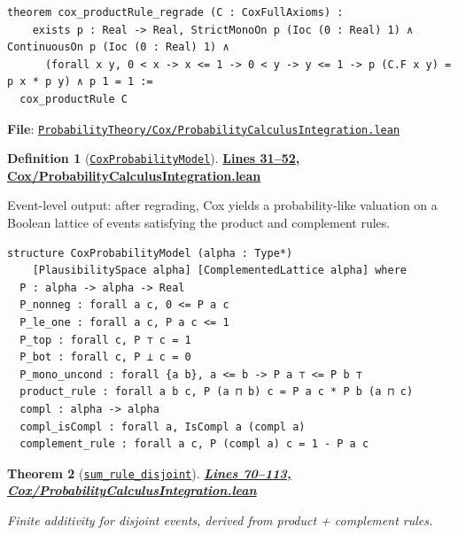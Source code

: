 \documentclass[11pt]{article}
\newtheorem{theorem}{Theorem}[section]
\theoremstyle{definition}
\newtheorem{definition}[theorem]{Definition}
\theoremstyle{remark}
\begin{document}
\begin{lstlisting}[caption={Bridge: Cox product rule as a K\&S-style regrade}]
theorem cox_productRule_regrade (C : CoxFullAxioms) :
    exists p : Real -> Real, StrictMonoOn p (Ioc (0 : Real) 1) ∧ ContinuousOn p (Ioc (0 : Real) 1) ∧
      (forall x y, 0 < x -> x <= 1 -> 0 < y -> y <= 1 -> p (C.F x y) = p x * p y) ∧ p 1 = 1 :=
  cox_productRule C
\end{lstlisting}

\textbf{File}: \href{https://github.com/zariuq/ks-foundations-of-inference/blob/main/ProbabilityTheory/Cox/ProbabilityCalculusIntegration.lean}{\texttt{ProbabilityTheory/Cox/ProbabilityCalculusIntegration.lean}}

\begin{definition}[\href{https://github.com/zariuq/ks-foundations-of-inference/blob/main/ProbabilityTheory/Cox/ProbabilityCalculusIntegration.lean\#L31}{\texttt{CoxProbabilityModel}}]
\textbf{\href{https://github.com/zariuq/ks-foundations-of-inference/blob/main/ProbabilityTheory/Cox/ProbabilityCalculusIntegration.lean\#L31-L52}{Lines 31--52, Cox/ProbabilityCalculusIntegration.lean}}

Event-level output: after regrading, Cox yields a probability-like valuation on a Boolean lattice of events
satisfying the product and complement rules.
\end{definition}

\begin{lstlisting}[caption={Event-level Cox model (product + complement rules)}]
structure CoxProbabilityModel (alpha : Type*)
    [PlausibilitySpace alpha] [ComplementedLattice alpha] where
  P : alpha -> alpha -> Real
  P_nonneg : forall a c, 0 <= P a c
  P_le_one : forall a c, P a c <= 1
  P_top : forall c, P ⊤ c = 1
  P_bot : forall c, P ⊥ c = 0
  P_mono_uncond : forall {a b}, a <= b -> P a ⊤ <= P b ⊤
  product_rule : forall a b c, P (a ⊓ b) c = P a c * P b (a ⊓ c)
  compl : alpha -> alpha
  compl_isCompl : forall a, IsCompl a (compl a)
  complement_rule : forall a c, P (compl a) c = 1 - P a c
\end{lstlisting}

\begin{theorem}[\href{https://github.com/zariuq/ks-foundations-of-inference/blob/main/ProbabilityTheory/Cox/ProbabilityCalculusIntegration.lean\#L70}{\texttt{sum\_rule\_disjoint}}]
\textbf{\href{https://github.com/zariuq/ks-foundations-of-inference/blob/main/ProbabilityTheory/Cox/ProbabilityCalculusIntegration.lean\#L70-L113}{Lines 70--113, Cox/ProbabilityCalculusIntegration.lean}}

Finite additivity for disjoint events, derived from product + complement rules.
\end{theorem}
\end{document}
